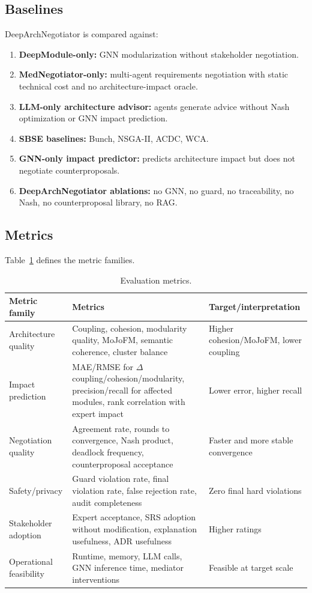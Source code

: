 \documentclass[english,preprint,nonatbib]{elsarticle}
\begin{document}
\subsection{Baselines}

DeepArchNegotiator is compared against:

\begin{enumerate}[leftmargin=2em]
  \item \textbf{DeepModule-only:} GNN modularization without stakeholder negotiation.
  \item \textbf{MedNegotiator-only:} multi-agent requirements negotiation with static technical cost and no architecture-impact oracle.
  \item \textbf{LLM-only architecture advisor:} agents generate advice without Nash optimization or GNN impact prediction.
  \item \textbf{SBSE baselines:} Bunch, NSGA-II, ACDC, WCA.
  \item \textbf{GNN-only impact predictor:} predicts architecture impact but does not negotiate counterproposals.
  \item \textbf{DeepArchNegotiator ablations:} no GNN, no guard, no traceability, no Nash, no counterproposal library, no RAG.
\end{enumerate}

\subsection{Metrics}

Table~\ref{tab:metrics} defines the metric families.

\begin{longtable}{p{3.4cm}p{8cm}p{4.3cm}}
\caption{Evaluation metrics.}\label{tab:metrics}\\
\toprule
Metric family & Metrics & Target/interpretation \\
\midrule
Architecture quality & Coupling, cohesion, modularity quality, MoJoFM, semantic coherence, cluster balance & Higher cohesion/MoJoFM, lower coupling \\
Impact prediction & MAE/RMSE for $\Delta$ coupling/cohesion/modularity, precision/recall for affected modules, rank correlation with expert impact & Lower error, higher recall \\
Negotiation quality & Agreement rate, rounds to convergence, Nash product, deadlock frequency, counterproposal acceptance & Faster and more stable convergence \\
Safety/privacy & Guard violation rate, final violation rate, false rejection rate, audit completeness & Zero final hard violations \\
Stakeholder adoption & Expert acceptance, SRS adoption without modification, explanation usefulness, ADR 
usefulness & Higher ratings \\
Operational feasibility & Runtime, memory, LLM calls, GNN inference time, mediator interventions & Feasible at target scale \\
\bottomrule
\end{longtable}
\end{document}

